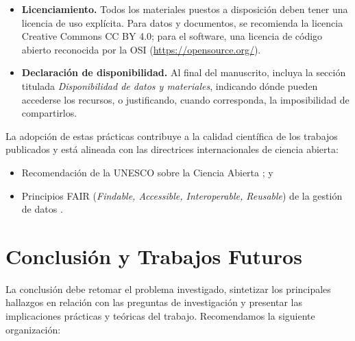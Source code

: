 \documentclass[spanish]{rbie2026}%
\begin{document}
\begin{itemize}
    \item \textbf{Licenciamiento.} Todos los materiales puestos a disposición deben tener una licencia de uso explícita. Para datos y documentos, se recomienda la licencia Creative Commons CC BY 4.0; para el software, una licencia de código abierto reconocida por la OSI (\url{https://opensource.org/}).

    \item \textbf{Declaración de disponibilidad.} Al final del manuscrito, incluya la sección titulada \textit{Disponibilidad de datos y materiales}, indicando dónde pueden accederse los recursos, o justificando, cuando corresponda, la imposibilidad de compartirlos.

\end{itemize}

La adopción de estas prácticas contribuye a la calidad científica de los trabajos publicados y está alineada con las directrices internacionales de ciencia abierta:

\begin{itemize}
    \item Recomendación de la UNESCO sobre la Ciencia Abierta \citep{UNESCO2022es}; y
    \item Principios FAIR (\textit{Findable, Accessible, Interoperable, Reusable}) de la gestión de datos \citep{FAIRprinciples2016}.
\end{itemize}



\section{Conclusión y Trabajos Futuros}
\label{sec:conclusion}

La conclusión debe retomar el problema investigado, sintetizar los principales hallazgos en relación con las preguntas de investigación y presentar las implicaciones prácticas y teóricas del trabajo. Recomendamos la siguiente organización:
\end{document}
